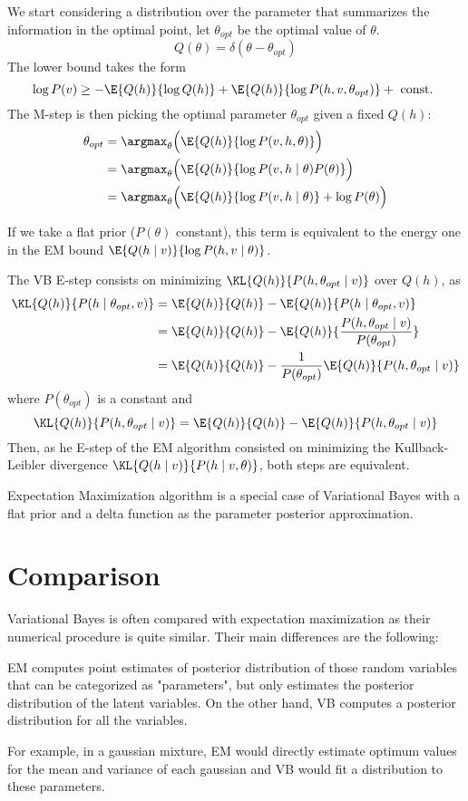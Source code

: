We start considering a distribution over the parameter that summarizes the information in the optimal point, let \(\theta_{opt}\) be the optimal value of \(\theta\).
\[
  Q(\theta) = \delta(\theta - \theta_{opt})
\]
The lower bound takes the form
\[
  \log{P(v)} \geq - \E{Q(h)}{\log{Q(h)}} + \E{Q(h)}{\log{P(h, v, \theta_{opt})}} + \text{ const. }
\]
The M-step is then picking the optimal parameter \(\theta_{opt}\) given a fixed \(Q(h)\):
\[
  \begin{aligned}
    \theta_{opt} &= \argmax_{\theta} \Big( \E{Q(h)}{\log{P(v,h,\theta)}} \Big)\\
    &=  \argmax_{\theta} \Big( \E{Q(h)}{\log{P(v, h \mid \theta)P(\theta)}} \Big) \\
    &= \argmax_{\theta} \Big( \E{Q(h)}{\log{P(v,h \mid\theta)}} + \log{P(\theta)} \Big) \\
  \end{aligned}
\]

If we take a flat prior (\(P(\theta) \)  constant), this term is equivalent to the energy one in the EM bound \(\E{Q(h\mid v)}{\log{P(h,v \mid \theta)}}\).

The VB E-step consists on minimizing \(\KL{Q(h)}{P(h,\theta_{opt} \mid v)}\) over \(Q(h)\), as
\[
  \begin{aligned}
    \KL{Q(h)}{P(h\mid \theta_{opt}, v)} &= \E{Q(h)}{Q(h)} - \E{Q(h)}{P(h \mid \theta_{opt}, v)} \\
    &= \E{Q(h)}{Q(h)} - \E{Q(h)}{\frac{P(h, \theta_{opt} \mid v)}{P(\theta_{opt})}}  \\
    &= \E{Q(h)}{Q(h)} - \frac{1}{P(\theta_{opt})}\E{Q(h)}{P(h, \theta_{opt} \mid v)}
\end{aligned}
\]
where \(P(\theta_{opt})\) is a constant and
\[
\KL{Q(h)}{P(h, \theta_{opt} \mid v)} = \E{Q(h)}{Q(h)} - \E{Q(h)}{P(h, \theta_{opt} \mid v)}
\]
Then, as  he E-step of the EM algorithm consisted on minimizing the Kullback-Leibler divergence \(\KL{Q(h \mid v)}{P(h \mid v, \theta)}\), both steps are equivalent.

\begin{remark}
  Expectation Maximization algorithm is a special case of Variational Bayes with a flat prior and a delta function as the parameter posterior approximation.
\end{remark}

\section{Comparison}
Variational Bayes is often compared with expectation maximization as their numerical procedure is quite similar. Their main differences are the following:

EM computes point estimates of posterior distribution of those random variables that can be categorized as "parameters", but only estimates the posterior distribution of the latent variables. On the other hand, VB computes a posterior distribution for all the variables.

For example, in a gaussian mixture, EM would directly estimate optimum values for the mean and variance of each gaussian and VB would fit a distribution to these parameters.
